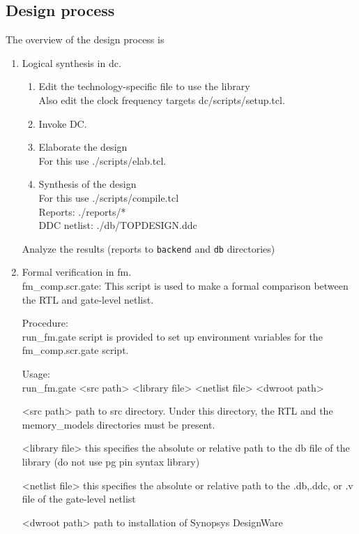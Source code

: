 \documentclass[a4paper,12pt,twoside]{article}
\begin{document}
\subsection{Design process}
The overview of the design process is
\begin{enumerate}
    \item Logical synthesis in dc.
    \begin{enumerate}
        \item Edit the technology-specific file to use the library\\
        Also edit the clock frequency targets dc/scripts/setup.tcl.
        \item Invoke DC.
        \item Elaborate the design\\
        For this use ./scripts/elab.tcl.
        \item Synthesis of the design\\
        For this use ./scripts/compile.tcl\\
        Reports: ./reports/*\\
        DDC netlist: ./db/TOPDESIGN.ddc
    \end{enumerate}
    Analyze the results (reports to \texttt{backend} and \texttt{db} directories)
    \item Formal verification in fm.\\
    fm\_comp.scr.gate: This script is used to make a formal comparison between the RTL and gate-level netlist. 
    
    Procedure:\\
    run\_fm.gate script is provided to set up environment variables for the fm\_comp.scr.gate script.
    
    Usage:\\
    run\_fm.gate <src path> <library file> <netlist file> <dwroot path>
    
     <src path>     path to src directory. Under this directory, the RTL and the memory\_models directories must be present.
    
     <library file> this specifies the absolute or relative path to the db file of the library (do not use pg pin syntax library)
    
     <netlist file> this specifies the absolute or relative path to the .db,.ddc, or .v file of the gate-level netlist
    
     <dwroot path>  path to installation of Synopsys DesignWare
    

\end{enumerate}
\end{document}
